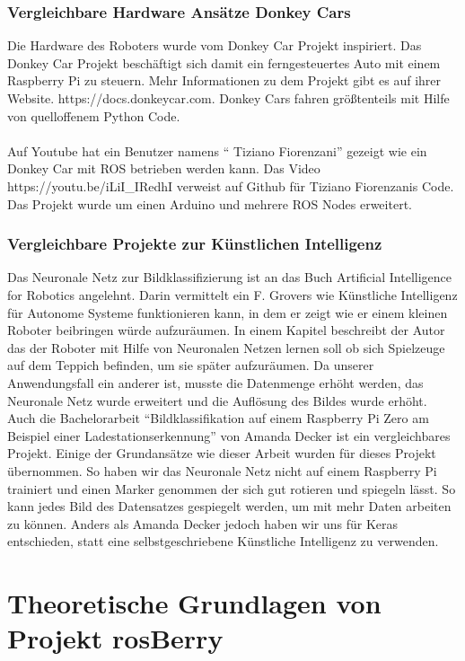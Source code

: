 \documentclass[conference]{IEEEtran}
\begin{document}
\subsubsection{Vergleichbare Hardware Ansätze Donkey Cars} %
Die Hardware des Roboters wurde vom Donkey Car Projekt inspiriert. Das Donkey Car Projekt beschäftigt sich damit ein ferngesteuertes Auto mit einem Raspberry Pi zu steuern. Mehr Informationen zu dem Projekt gibt es auf ihrer Website. https://docs.donkeycar.com. Donkey Cars fahren größtenteils mit Hilfe von quelloffenem Python Code. \\
\\
Auf Youtube hat ein Benutzer namens "` Tiziano Fiorenzani"' gezeigt wie ein Donkey Car mit ROS betrieben werden kann. Das Video https://youtu.be/iLiI\_IRedhI verweist auf Github für Tiziano Fiorenzanis Code. Das Projekt wurde um einen Arduino und mehrere ROS Nodes erweitert.
\subsubsection{Vergleichbare Projekte zur Künstlichen Intelligenz} %

 Das Neuronale Netz zur Bildklassifizierung ist an das Buch  Artificial Intelligence for Robotics  \cite{b1} angelehnt. Darin vermittelt ein F. Grovers wie Künstliche Intelligenz für Autonome Systeme  funktionieren kann, in dem er zeigt wie er einem kleinen Roboter beibringen würde aufzuräumen. In einem Kapitel beschreibt der Autor das der Roboter mit Hilfe von Neuronalen Netzen lernen soll ob sich Spielzeuge auf dem Teppich befinden, um sie später aufzuräumen.  Da unserer Anwendungsfall ein anderer ist, musste die Datenmenge erhöht werden, das Neuronale Netz wurde erweitert und die Auflösung des Bildes wurde erhöht.\\

Auch die Bachelorarbeit  "`Bildklassifikation auf einem Raspberry Pi Zero
am Beispiel einer Ladestationserkennung"' von Amanda Decker ist ein vergleichbares Projekt. Einige der Grundansätze wie dieser Arbeit wurden für dieses Projekt übernommen. So haben wir das Neuronale Netz nicht auf einem Raspberry Pi trainiert und einen Marker genommen der sich gut rotieren und spiegeln lässt. So kann jedes Bild des Datensatzes gespiegelt werden, um mit mehr Daten arbeiten zu können. Anders als Amanda Decker jedoch haben wir uns für Keras entschieden, statt eine selbstgeschriebene Künstliche Intelligenz zu verwenden. 
\section{Theoretische Grundlagen von Projekt rosBerry}
\end{document}
